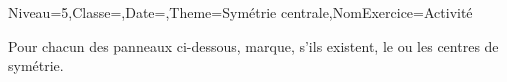 \begin{Maquette}[Fiche]{Niveau=5\ieme{},Classe={},Date={},Theme=Symétrie centrale,NomExercice=Activité}
\begin{exercice}
	Pour chacun des panneaux ci-dessous, marque, s'ils existent, le ou les centres de symétrie.
	
	 \hfill \prChausRet \hfill \prDeuxSens \hfill \prRoutePrio \hfill \prRondPoint \hfill \prCircInterd \hfill \prSensInterdit \hfill \prStationInterd \hfill \prObliAvDroite \hfill \prObliDroiteGauche \hfill \prObliChaines \hfill \prFinInterd
\end{exercice}


\end{Maquette}

% 